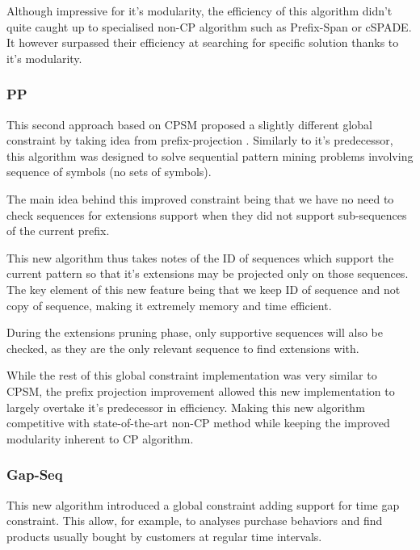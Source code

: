 \documentclass{eplmastersthesis}
\begin{document}
Although impressive for it's modularity, the efficiency of this algorithm didn't quite caught up to specialised non-CP algorithm such as Prefix-Span or cSPADE. It however surpassed their efficiency at searching for specific solution thanks to it's modularity.

\subsubsection{PP}

This second approach based on CPSM proposed a slightly different global constraint by taking idea from prefix-projection \cite{kemmar2015prefix}. Similarly to it's predecessor, this algorithm was designed to solve sequential pattern mining problems involving sequence of symbols (no sets of symbols).

The main idea behind this improved constraint being that we have no need to check sequences for extensions support when they did not support sub-sequences of the current prefix. \newline

This new algorithm thus takes notes of the ID of sequences which support the current pattern so that it's extensions may be projected only on those sequences. The key element of this new feature being that we keep ID of sequence and not copy of sequence, making it extremely memory and time efficient. \newline

During the extensions pruning phase, only supportive sequences will also be checked, as they are the only relevant sequence to find extensions with. \newline

While the rest of this global constraint implementation was very similar to CPSM, the prefix projection improvement allowed this new implementation to largely overtake it's predecessor in efficiency. Making this new algorithm competitive with state-of-the-art non-CP method while keeping the improved modularity inherent to CP algorithm.

\subsubsection{Gap-Seq}

This new algorithm introduced a global constraint adding support for time gap constraint. This allow, for example, to analyses purchase behaviors and find products usually bought by customers at regular time intervals. \newline
\end{document}
